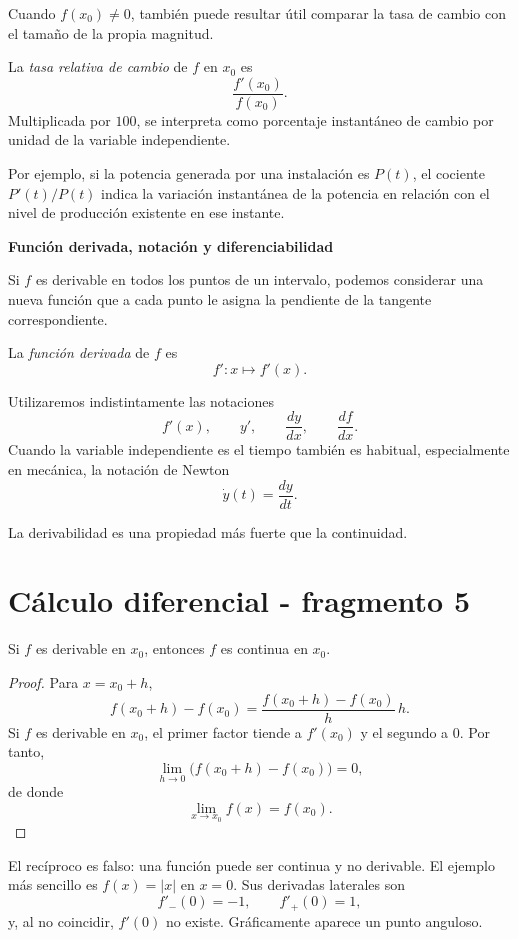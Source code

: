 Cuando $f(x_0)\neq0$, también puede resultar útil comparar la tasa de cambio con el tamaño de la propia magnitud.

\begin{definition}
La \emph{tasa relativa de cambio} de $f$ en $x_0$ es
\[
\frac{f'(x_0)}{f(x_0)}.
\]
Multiplicada por $100$, se interpreta como porcentaje instantáneo de cambio por unidad de la variable independiente.
\end{definition}

Por ejemplo, si la potencia generada por una instalación es $P(t)$, el cociente $P'(t)/P(t)$ indica la variación instantánea de la potencia en relación con el nivel de producción existente en ese instante.

\textbf{Función derivada, notación y diferenciabilidad}

Si $f$ es derivable en todos los puntos de un intervalo, podemos considerar una nueva función que a cada punto le asigna la pendiente de la tangente correspondiente.

\begin{definition}
La \emph{función derivada} de $f$ es
\[
f':x\longmapsto f'(x).
\]
\end{definition}

Utilizaremos indistintamente las notaciones
\[
f'(x),
\qquad
y',
\qquad
\frac{dy}{dx},
\qquad
\frac{df}{dx}.
\]
Cuando la variable independiente es el tiempo también es habitual, especialmente en mecánica, la notación de Newton
\[
\dot y(t)=\frac{dy}{dt}.
\]

La derivabilidad es una propiedad más fuerte que la continuidad.


\section{Cálculo diferencial - fragmento 5}
\begin{theorem}
Si $f$ es derivable en $x_0$, entonces $f$ es continua en $x_0$.
\end{theorem}

\begin{proof}
Para $x=x_0+h$,
\[
f(x_0+h)-f(x_0)
=
\frac{f(x_0+h)-f(x_0)}{h}\,h.
\]
Si $f$ es derivable en $x_0$, el primer factor tiende a $f'(x_0)$ y el segundo a $0$. Por tanto,
\[
\lim_{h\to0}\bigl(f(x_0+h)-f(x_0)\bigr)=0,
\]
de donde
\[
\lim_{x\to x_0}f(x)=f(x_0).
\]
\end{proof}

El recíproco es falso: una función puede ser continua y no derivable. El ejemplo más sencillo es $f(x)=|x|$ en $x=0$. Sus derivadas laterales son
\[
f'_-(0)=-1,
\qquad
f'_+(0)=1,
\]
y, al no coincidir, $f'(0)$ no existe. Gráficamente aparece un punto anguloso.

